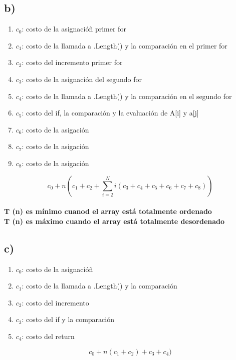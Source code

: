 \documentclass[10pt,a4paper]{article}
\begin{document}
        \subsection{b)}
            \begin{enumerate}
                \item $c_{0}$: costo de la asignacióñ primer for
                \item $c_{1}$: costo de la llamada a .Length() y la comparación en el primer for
                \item $c_{2}$: costo del incremento primer for
                \item $c_{3}$: costo de la asignación del segundo for
                \item $c_{4}$: costo de la llamada a .Length() y la comparación en el segundo for
                \item $c_{5}$: costo del if, la comparación y la evaluación de A[i] y a[j]
                \item $c_{6}$: costo de la asigación
                \item $c_{7}$: costo de la asigación
                \item $c_{8}$: costo de la asigación
            \end{enumerate}
            \[ c_{0} + n \left( c_{1} + c_{2} + \sum_{i=2}^{N} i \left(c_{3} +c_{4} + c_{5} +c_{6} +c_{7} +c_{8} \right)\right) \]
            \paragraph{
                T (n) es m\'inimo cuanod el array est\'a totalmente ordenado \\
                T (n) es m\'aximo cuando el array est\'a totalmente desordenado
                }
        \subsection{c)}  
            \begin{enumerate}
                \item $c_{0}$: costo de la asignacióñ
                \item $c_{1}$: costo de la llamada a .Length() y la comparación
                \item $c_{2}$: costo del incremento
                \item $c_{3}$: costo del if y la comparación
                \item $c_{4}$: costo del return
            \end{enumerate}
        \[ c_{0} + n(c_{1} + c_{2}) + c_{3} +c_{4}) \]
\end{document}

